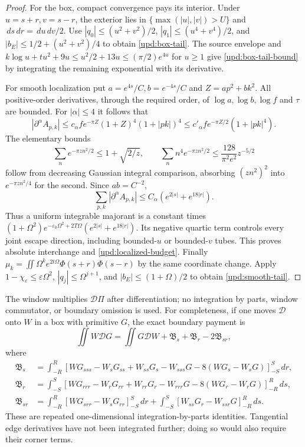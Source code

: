 \documentclass[11pt]{article}
\numberwithin{equation}{section}
\theoremstyle{definition}
\theoremstyle{remark}
\newcommand{\dd}{\,d}
\begin{document}
\begin{proof}
For the box, compact convergence pays its interior. Under
$u=s+r,v=s-r$, the exterior lies in
$\{\max(|u|,|v|)>U\}$ and $\dd s\dd r=\dd u\dd v/2$.
Use
$|q_0|\le(u^2+v^2)/2$, $|q_1|\le(u^4+v^4)/2$, and
$|b_E|\le1/2+(u^2+v^2)/4$ to obtain \eqref{upd:box-tail}.
The source envelope and
$k\log u+tu^2+9u\le u^2/2+13u\le(\pi/2)e^{4u}$ for $u\ge1$
give \eqref{upd:box-tail-bound} by integrating the remaining
exponential with its derivative.

For smooth localization put $a=e^{4s}/C,b=e^{-4s}/C$ and
$Z=ap^2+bk^2$. All positive-order derivatives, through the required
order, of $\log a,\log b,\log f$ and $\tau$ are bounded.
For $|\alpha|\le4$ it follows that
\[
 |\partial^\alpha A_{p,k}|
 \le c_\alpha f e^{-\pi Z}(1+Z)^4(1+|pk|)^4
 \le c'_\alpha f e^{-\pi Z/2}(1+|pk|^4).
\]
The elementary bounds
\[
 \sum_n e^{-\pi zn^2/2}\le1+\sqrt{2/z},\qquad
 \sum_n n^4e^{-\pi zn^2/2}\le\frac{128}{\pi^2e^2}z^{-5/2}
\]
follow from decreasing Gaussian integral comparison, absorbing
$(zn^2)^2$ into $e^{-\pi zn^2/4}$ for the second. Since $ab=C^{-2}$,
\[
 \sum_{p,k}|\partial^\alpha A_{p,k}|
                  \le C_\alpha(e^{2|s|}+e^{18|r|}).
\]
Thus a uniform integrable majorant is a constant times
$(1+\Omega^2)e^{-\varepsilon_0\Omega^2+2T\Omega}
(e^{2|s|}+e^{18|r|})$. Its negative quartic term controls every
joint escape direction, including bounded-$u$ or bounded-$v$ tubes.
This proves absolute interchange and \eqref{upd:localized-budget}.
Finally $\mu_k=\iint\Omega^ke^{2t\Omega}\Phi(s+r)\Phi(s-r)$ by
the same coordinate change. Apply
$1-\chi_\varepsilon\le\varepsilon\Omega^2$,
$|q_j|\le\Omega^{j+1}$, and $|b_E|\le(1+\Omega)/2$ to obtain
\eqref{upd:smooth-tail}.
\end{proof}

The window multiplies $\mathscr D\Pi$ after differentiation; no
integration by parts, window commutator, or boundary omission is used.
For completeness, if one moves $\mathscr D$ onto $W$ in a box with
primitive $G$, the exact boundary payment is
\[
 \iint W\mathscr DG=\iint G\mathscr DW+\mathfrak B_s+\mathfrak B_r
                                      -2\mathfrak B_{sr},
\]
where
\begin{align*}
 \mathfrak B_s&=\int_{-R}^{R}
 [WG_{sss}-W_sG_{ss}+W_{ss}G_s-W_{sss}G
                      -8(WG_s-W_sG)]_{-S}^{S}\dd r,\\
 \mathfrak B_r&=\int_{-S}^{S}
 [WG_{rrr}-W_rG_{rr}+W_{rr}G_r-W_{rrr}G
                      -8(WG_r-W_rG)]_{-R}^{R}\dd s,\\
 \mathfrak B_{sr}&=\int_{-R}^{R}[WG_{srr}-W_sG_{rr}]_{-S}^{S}\dd r
       +\int_{-S}^{S}[W_{ss}G_r-W_{ssr}G]_{-R}^{R}\dd s.
\end{align*}
These are repeated one-dimensional integration-by-parts identities.
Tangential edge derivatives have not been integrated further; doing so
would also require their corner terms.
\end{document}
